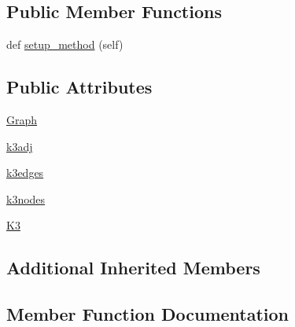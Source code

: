 \subsection*{Public Member Functions}
\begin{DoxyCompactItemize}
\item 
def \hyperlink{classnetworkx_1_1classes_1_1tests_1_1test__special_1_1TestThinGraph_a8dd471e9a524afb853511652b07d2ec7}{setup\+\_\+method} (self)
\end{DoxyCompactItemize}
\subsection*{Public Attributes}
\begin{DoxyCompactItemize}
\item 
\hyperlink{classnetworkx_1_1classes_1_1tests_1_1test__special_1_1TestThinGraph_a1cdb840ef7dc65b37f3074c798c61d42}{Graph}
\item 
\hyperlink{classnetworkx_1_1classes_1_1tests_1_1test__special_1_1TestThinGraph_a8a18e0129e63cfc59011dd968aea0bb0}{k3adj}
\item 
\hyperlink{classnetworkx_1_1classes_1_1tests_1_1test__special_1_1TestThinGraph_a1e9456d7ec1f56ed245a0d1c20502112}{k3edges}
\item 
\hyperlink{classnetworkx_1_1classes_1_1tests_1_1test__special_1_1TestThinGraph_a461af7a4d8d3e9c9c9f414d89ff9422b}{k3nodes}
\item 
\hyperlink{classnetworkx_1_1classes_1_1tests_1_1test__special_1_1TestThinGraph_a8375b4374a3961cc1fef3caaac9974fc}{K3}
\end{DoxyCompactItemize}
\subsection*{Additional Inherited Members}


\subsection{Member Function Documentation}
\mbox{\label{classnetworkx_1_1classes_1_1tests_1_1test__special_1_1TestThinGraph_a8dd471e9a524afb853511652b07d2ec7}} 
